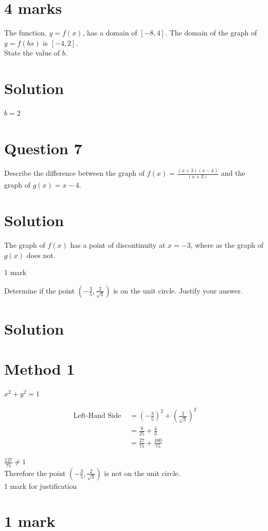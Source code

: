 \documentclass[10pt]{article}
\begin{document}
\section*{4 marks}
The function, $y=f(x)$, has a domain of $[-8,4]$. The domain of the graph of $y=f(b x)$ is $[-4,2]$.\\
State the value of $b$.

\section*{Solution}
$b=2$

\section*{Question 7}
Describe the difference between the graph of $f(x)=\frac{(x+3)(x-4)}{(x+3)}$ and the graph of $g(x)=x-4$.

\section*{Solution}
The graph of $f(x)$ has a point of discontinuity at $x=-3$, where as the graph of $g(x)$ does not.

1 mark

Determine if the point $\left(-\frac{3}{5}, \frac{2}{\sqrt{3}}\right)$ is on the unit circle. Justify your answer.

\section*{Solution}
\section*{Method 1}
$x^{2}+y^{2}=1$

$$
\begin{aligned}
\text { Left-Hand Side } & =\left(-\frac{3}{5}\right)^{2}+\left(\frac{2}{\sqrt{3}}\right)^{2} \\
& =\frac{9}{25}+\frac{4}{3} \\
& =\frac{27}{75}+\frac{100}{75}
\end{aligned}
$$

$\frac{127}{75} \neq 1$\\
Therefore the point $\left(-\frac{3}{5}, \frac{2}{\sqrt{3}}\right)$ is not on the unit circle.\\
1 mark for justification

\section*{1 mark}
\end{document}

